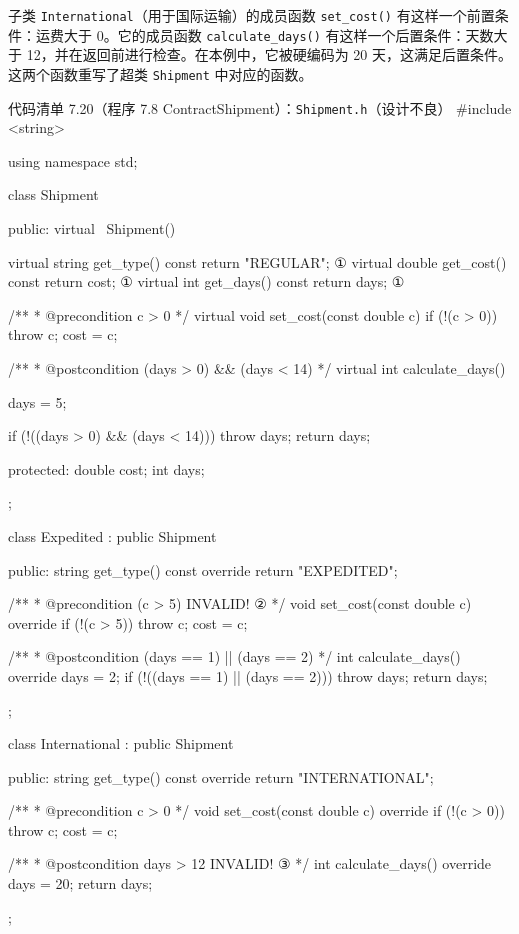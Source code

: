 子类 \texttt{International}（用于国际运输）的成员函数 \texttt{set\_\allowbreak{}cost(\allowbreak{})\allowbreak{}} 有这样一个前置条件：运费大于 0。它的成员函数 \texttt{calculate\_\allowbreak{}days(\allowbreak{})\allowbreak{}} 有这样一个后置条件：天数大于 12，并在返回前进行检查。在本例中，它被硬编码为 20 天，这满足后置条件。这两个函数重写了超类 \texttt{Shipment} 中对应的函数。

\begin{codeboxt}{代码清单 7.20（程序 7.8 ContractShipment）：\texttt{Shipment.\allowbreak{}h}（设计不良）}
#include <string>

using namespace std;

class Shipment
{
public:
    virtual ~Shipment() {}

    virtual string get_type() const { return "REGULAR"; } ①
    virtual double get_cost() const { return cost; }      ①
    virtual int    get_days() const { return days; }      ①

    /**
     * @precondition c > 0
     */
    virtual void set_cost(const double c)
    {
        if (!(c > 0)) throw c;
        cost = c;
    }

    /**
     * @postcondition (days > 0) && (days < 14)
     */
    virtual int calculate_days()
    {
        days = 5;

        if (!((days > 0) && (days < 14))) throw days;
        return days;
    }

protected:
    double cost;
    int days;
};

class Expedited : public Shipment
{
public:
    string get_type() const override { return "EXPEDITED"; }

    /**
     * @precondition (c > 5)  INVALID!                     ②
     */
    void set_cost(const double c) override
    {
        if (!(c > 5)) throw c;
        cost = c;
    }

    /**
     * @postcondition (days == 1) || (days == 2)
     */
    int calculate_days() override
    {
        days = 2;
        if (!((days == 1) || (days == 2))) throw days;
        return days;
    }
};

class International : public Shipment
{
public:
    string get_type() const override { return "INTERNATIONAL"; }

    /**
     * @precondition c > 0
     */
    void set_cost(const double c) override
    {
        if (!(c > 0)) throw c;
        cost = c;
    }

    /**
     * @postcondition days > 12  INVALID!                  ③
     */
    int calculate_days() override
    {
        days = 20;
        return days;
    }
};
\end{codeboxt}
\par
{}\par
{}\par

